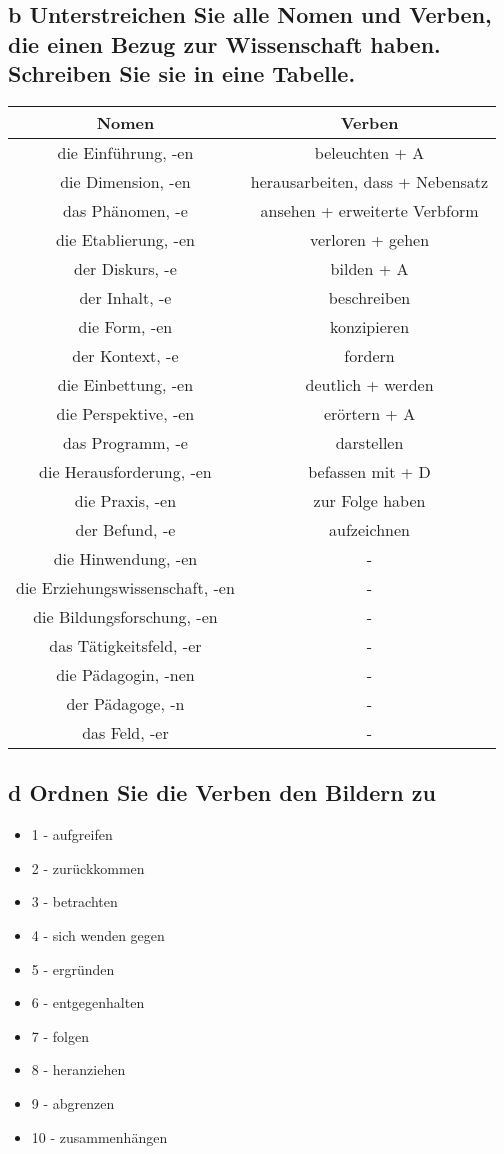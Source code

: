 \documentclass{article}
\begin{document}
	\subsection*{\textbf{b} Unterstreichen Sie alle Nomen und Verben, die einen Bezug zur Wissenschaft haben. Schreiben Sie sie in eine Tabelle.}
	\begin{center}
	\begin{tabular}{| c | c |}
		\toprule
		\textbf{Nomen} & \textbf{Verben} \\ \midrule
		die Einführung, -en & beleuchten + A \\
		die Dimension, -en & herausarbeiten, dass + Nebensatz \\
		das Phänomen, -e & ansehen + erweiterte Verbform \\
		die Etablierung, -en & verloren + gehen \\
		der Diskurs, -e & bilden + A \\
		der Inhalt, -e & beschreiben \\
		die Form, -en & konzipieren \\
		der Kontext, -e & fordern \\
		die Einbettung, -en & deutlich + werden \\
		die Perspektive, -en & erörtern + A \\
		das Programm, -e & darstellen \\
		die Herausforderung, -en & befassen mit + D \\
		die Praxis, -en & zur Folge haben \\
		der Befund, -e & aufzeichnen \\
		die Hinwendung, -en & - \\
		die Erziehungswissenschaft, -en & - \\
		die Bildungsforschung, -en & - \\
		das Tätigkeitsfeld, -er & - \\
		die Pädagogin, -nen & - \\
		der Pädagoge, -n & - \\
		das Feld, -er & - \\
		\bottomrule
	\end{tabular}
	\end{center}

	\subsection{\textbf{d} Ordnen Sie die Verben den Bildern zu}
	\begin{itemize}
		\item{1 - aufgreifen}
		\item{2 - zurückkommen}
		\item{3 - betrachten}
		\item{4 - sich wenden gegen}
		\item{5 - ergründen}
		\item{6 - entgegenhalten}
		\item{7 - folgen}
		\item{8 - heranziehen}
		\item{9 - abgrenzen}
		\item{10 - zusammenhängen}
	\end{itemize}
\end{document}
